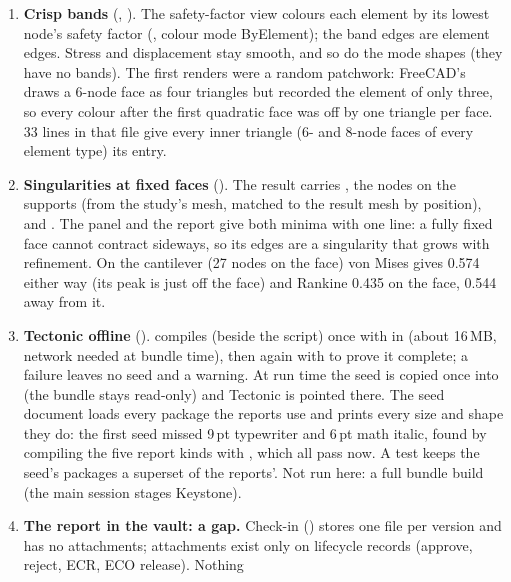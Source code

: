 \begin{enumerate}[nosep]
  \item \textbf{Crisp bands} (, ). The safety-factor view colours each element by its
        lowest node's safety factor (, colour mode ByElement); the band edges are element edges.
        Stress and displacement stay smooth, and so do the mode shapes (they have no bands). The first renders were
        a random patchwork: FreeCAD's  draws a 6-node face as four triangles but recorded
        the element of only three, so every colour after the first quadratic face was off by one triangle per face.
        33 lines in that file give every inner triangle (6- and 8-node faces of every element type) its entry.
  \item \textbf{Singularities at fixed faces} (). The result carries , the nodes on
        the supports (from the study's mesh, matched to the result mesh by position), and
        . The panel and the report give both minima with one line: a fully
        fixed face cannot contract sideways, so its edges are a singularity that grows with refinement. On the
        cantilever (27 nodes on the face) von Mises gives 0.574 either way (its peak is just off the face) and
        Rankine 0.435 on the face, 0.544 away from it.
  \item \textbf{Tectonic offline} ().  compiles
         (beside the script) once with  in
         (about 16\,MB, network needed at bundle time), then again with
         to prove it complete; a failure leaves no seed and a warning. At run time the seed is
        copied once into  (the bundle stays read-only) and
        Tectonic is pointed there. The seed document loads every package the reports use and prints every size and
        shape they do: the first seed missed 9\,pt typewriter and 6\,pt math italic, found by compiling the five
        report kinds with , which all pass now. A test keeps the seed's packages a superset of the
        reports'. Not run here: a full bundle build (the main session stages Keystone).
  \item \textbf{The report in the vault: a gap.} Check-in () stores one file per version and
        has no attachments; attachments exist only on lifecycle records (approve, reject, ECR, ECO release). Nothing

\end{enumerate}

